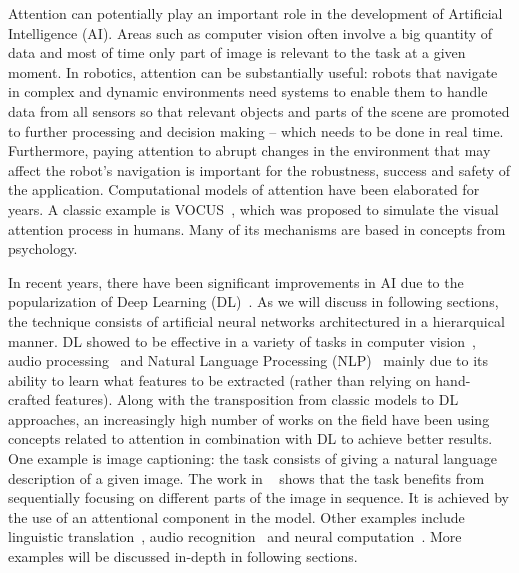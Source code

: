 \documentclass[article]{IEEEtran}
\begin{document}
Attention can potentially play an important role in the development
of Artificial Intelligence (AI).
Areas such as computer vision often involve a big quantity of data
and most of time only part of image is relevant to the task at a given moment.
In robotics, attention can be substantially useful:
robots that navigate in complex and dynamic environments need
systems to enable them to handle data from all sensors
so that relevant objects and parts of the scene are promoted to
further processing and decision making -- which needs to be done in real time.
Furthermore, paying attention to abrupt changes in the environment
that may affect the robot's navigation is important for
the robustness, success and safety of the application.
Computational models of attention have been elaborated for years.
A classic example is VOCUS~\cite{ref:vocus}, which was proposed to
simulate the visual attention process in humans.
Many of its mechanisms are based in concepts from psychology.

In recent years, there have been significant improvements in
AI due to the popularization of Deep Learning (DL)~\cite{ref:dl}.
As we will discuss in following sections, the technique consists of
artificial neural networks architectured in a hierarquical manner.
DL showed to be effective in a variety of tasks in
computer vision~\cite{ref:imagenet}\cite{ref:segmentation},
audio processing~\cite{ref:wavenet} and Natural Language
Processing (NLP)~\cite{ref:att-all-you-need} mainly due to its ability
to learn what features to be extracted (rather than relying on hand-crafted
features).
Along with the transposition from classic models to DL
approaches, an increasingly high number of works on the field
have been using concepts related to attention in combination with DL
to achieve better results.
One example is image captioning: the task
consists of giving a natural language description of a given image.
The work in ~\cite{ref:img-captioning} shows that the task benefits from
sequentially focusing on different parts of the image in sequence.
It is achieved by the use of an attentional component in the model.
Other examples include linguistic translation~\cite{ref:translation},
audio recognition~\cite{ref:audio} and neural computation~\cite{ref:ntm}.
More examples will be discussed in-depth in following sections.
\end{document}
